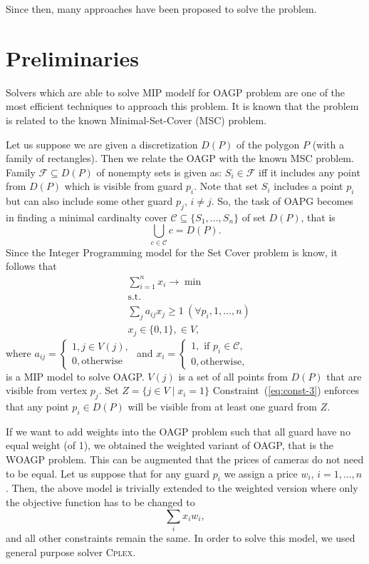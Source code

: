 \documentclass[runningheads,a4paper]{llncs}
\begin{document}
     Since then, many approaches have been proposed to solve the problem.
     \section{Preliminaries}
     Solvers which are able to solve MIP modelf for OAGP problem are one of the most efficient techniques to approach this problem. It is known that the problem is related to the known Minimal-Set-Cover (MSC) problem. 

     Let us suppose we are given a discretization $D(P)$ of the polygon $P$ (with a family of rectangles). Then we relate the OAGP with the known MSC problem.  
     Family $\mathcal{F}\subseteq D(P)$ of nonempty sets is given as: $S_i \in \mathcal{F}$ iff it includes any point from $D(P)$ which is visible from guard $p_i$. Note that set $S_i$ includes a point $p_i$ but can also include some other guard $p_j$, $i \neq j$. So, the task of OAPG becomes in finding a minimal cardinalty cover $\mathcal{C}\subseteq\{S_1,...,S_n\}$ of set $D(P)$, that is 
     $$ \bigcup_{c \in \mathcal{C}} c = D(P).$$ Since the Integer Programming model for the Set Cover problem is know, it follows that 
     \begin{align}
        &\sum_{i=1}^n x_i \longrightarrow \min \\
        &\mbox{s.t.} \\
        &\sum_{j} a_{ij}x_j \geq 1\ (\forall p_i,1,...,n) \label{eq:const-3}\\
        & x_j \in \{0,1\},  \in V,
     \end{align}
     where 
     $a_{ij} = \begin{cases}
          1, j \in V(j), \\
          0, \mbox{otherwise} 
     \end{cases}$ 
     and $x_i = \begin{cases}
     	 1, \mbox{ if } p_i \in \mathcal{C},\\
     	 0, \mbox{otherwise},
     \end{cases}$ \\
      is a MIP model to solve OAGP. 
     $V(j)$ is a set of all points from $D(P)$ that are visible from vertex $p_j$. Set $Z = \{j \in V\mid x_i=1\}$
     Constraint~(\ref{eq:const-3}) enforces that any point $p_i \in D(P)$ will be visible from at least one guard from $Z$.
     
     If we want to add weights into the OAGP problem such that all guard have no equal weight (of 1), we obtained the weighted variant of OAGP, that is the WOAGP problem. This can be augmented that the prices of cameras do not need to be equal.  Let us suppose that for any guard $p_i$ we assign a price $w_i$, $i=1,...,n$. Then, the above model is trivially extended to the weighted version where only the objective function has to be changed to
     $$ \sum_{i} x_i w_i,$$
      and all other constraints remain the same.
      In order to solve this model, we used general purpose solver \textsc{Cplex}. 
\end{document}
